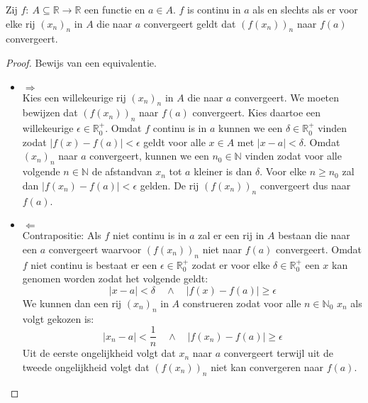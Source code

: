 \documentclass[main.tex]{subfiles}
\begin{document}
\begin{pr}
  \label{pr:continu-asa-behoudt-convergentie}
  Zij $f:\ A \subseteq \mathbb{R} \rightarrow \mathbb{R}$ een functie en $a\in A$.
  $f$ is continu in $a$ als en slechts als er voor elke rij $(x_{n})_{n}$ in $A$ die naar $a$ convergeert geldt dat $(f(x_{n}))_{n}$ naar $f(a)$ convergeert.

  \begin{proof}
    Bewijs van een equivalentie.
    \begin{itemize}
    \item $\Rightarrow$\\
      Kies een willekeurige rij $(x_{n})_{n}$ in $A$ die naar $a$ convergeert.
      We moeten bewijzen dat $(f(x_{n}))_{n}$ naar $f(a)$ convergeert.
      Kies daartoe een willekeurige $\epsilon \in \mathbb{R}_{0}^{+}$.
      Omdat $f$ continu is in $a$ kunnen we een $\delta\in \mathbb{R}_{0}^{+}$ vinden zodat $|f(x)-f(a)| < \epsilon$ geldt voor alle $x\in A$ met $|x-a| < \delta$.
      Omdat $(x_{n})_{n}$ naar $a$ convergeert, kunnen we een $n_{0}\in \mathbb{N}$ vinden zodat voor alle volgende $n\in\mathbb{N}$ de afstandvan $x_{n}$ tot $a$ kleiner is dan $\delta$.
      Voor elke $n\ge n_{0}$ zal dan $|f(x_{n})-f(a)| < \epsilon$ gelden.
      De rij $(f(x_{n}))_{n}$ convergeert dus naar $f(a)$.
    \item $\Leftarrow$\\
      Contrapositie: Als $f$ niet continu is in $a$ zal er een rij in $A$ bestaan die naar een $a$ convergeert waarvoor $(f(x_{n}))_{n}$ niet naar $f(a)$ convergeert.
      Omdat $f$ niet continu is bestaat er een $\epsilon \in \mathbb{R}_{0}^{+}$ zodat er voor elke $\delta\in \mathbb{R}_{0}^{+}$ een $x$ kan genomen worden zodat het volgende geldt:
      \[ |x-a| < \delta \quad\wedge\quad |f(x)-f(a)| \ge \epsilon \]
      We kunnen dan een rij $(x_{n})_{n}$ in $A$ construeren zodat voor alle $n\in\mathbb{N}_{0}$ $x_{n}$ als volgt gekozen is:
      \[ |x_{n}-a| < \frac{1}{n} \quad\wedge\quad |f(x_{n})-f(a)| \ge \epsilon \]
      Uit de eerste ongelijkheid volgt dat $x_{n}$ naar $a$ convergeert terwijl uit de tweede ongelijkheid volgt dat $(f(x_{n}))_{n}$ niet kan convergeren naar $f(a)$.
    \end{itemize}
  \end{proof}
\end{pr}
\end{document}
